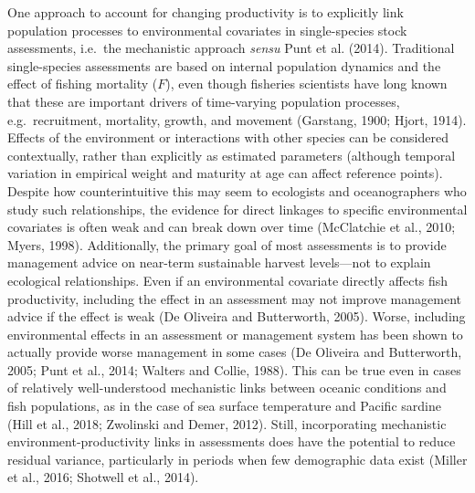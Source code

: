 \documentclass[]{article}
\begin{document}
One approach to account for changing productivity is to explicitly link
population processes to environmental covariates in single-species stock
assessments, i.e.~the mechanistic approach \emph{sensu} Punt et al.
(2014). Traditional single-species assessments are based on internal
population dynamics and the effect of fishing mortality (\(F\)), even
though fisheries scientists have long known that these are important
drivers of time-varying population processes, e.g.~recruitment,
mortality, growth, and movement (Garstang, 1900; Hjort, 1914). Effects
of the environment or interactions with other species can be considered
contextually, rather than explicitly as estimated parameters (although
temporal variation in empirical weight and maturity at age can affect
reference points). Despite how counterintuitive this may seem to
ecologists and oceanographers who study such relationships, the evidence
for direct linkages to specific environmental covariates is often weak
and can break down over time (McClatchie et al., 2010; Myers, 1998).
Additionally, the primary goal of most assessments is to provide
management advice on near-term sustainable harvest levels---not to
explain ecological relationships. Even if an environmental covariate
directly affects fish productivity, including the effect in an
assessment may not improve management advice if the effect is weak (De
Oliveira and Butterworth, 2005). Worse, including environmental effects
in an assessment or management system has been shown to actually provide
worse management in some cases (De Oliveira and Butterworth, 2005; Punt
et al., 2014; Walters and Collie, 1988). This can be true even in cases
of relatively well-understood mechanistic links between oceanic
conditions and fish populations, as in the case of sea surface
temperature and Pacific sardine (Hill et al., 2018; Zwolinski and Demer,
2012). Still, incorporating mechanistic environment-productivity links
in assessments does have the potential to reduce residual variance,
particularly in periods when few demographic data exist (Miller et al.,
2016; Shotwell et al., 2014).
\end{document}
